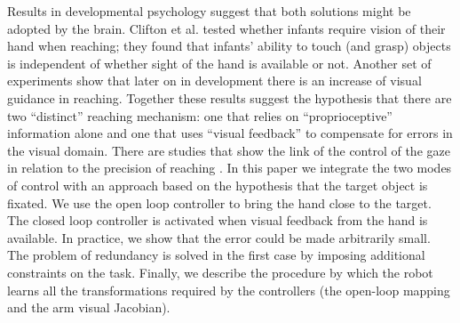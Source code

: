 

Results in developmental psychology suggest that both solutions might be
adopted by the brain. Clifton et al. \cite{clifton93isvisually} 
tested whether infants require vision of their hand when reaching; they 
found that infants' ability to touch (and grasp) objects is independent 
of whether sight of the hand is available or not. Another set of 
experiments \cite{ashmead93visual} show that later on in development 
there is an increase of visual guidance in reaching. Together these results 
suggest the hypothesis that there are two ``distinct'' reaching mechanism: 
one that relies on ``proprioceptive'' information alone and one that uses 
``visual feedback'' to compensate for errors in the visual domain. 
There are studies that show the link of the control of the gaze in relation
to the precision of reaching \cite{flanders-daghestani-berthoz-1999}. 
In this paper we integrate the two modes of control with an approach based on
the hypothesis that the target object is fixated. We use the open loop
controller to bring the hand close to the target. The closed loop controller 
is activated when visual feedback from the hand is available. In practice,
we show that the error could be made arbitrarily small. The problem of 
redundancy is solved in the first case by imposing additional constraints on 
the task. Finally, we describe the procedure by which the robot learns all 
the transformations required by the controllers (the open-loop mapping and 
the arm visual Jacobian).